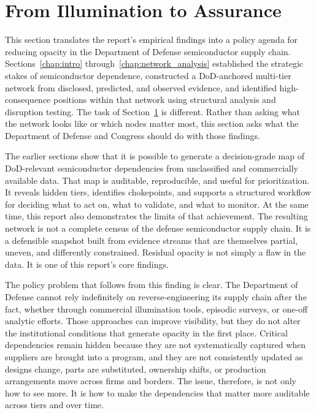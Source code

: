 \chapter{From Illumination to Assurance}
\label{chap:from_illumination_to_assurance}

This section translates the report's empirical findings into a policy agenda for reducing opacity in the Department of Defense semiconductor supply chain. Sections~\ref{chap:intro} through~\ref{chap:network_analysis} established the strategic stakes of semiconductor dependence, constructed a DoD-anchored multi-tier network from disclosed, predicted, and observed evidence, and identified high-consequence positions within that network using structural analysis and disruption testing. The task of Section~\ref{chap:from_illumination_to_assurance} is different. Rather than asking what the network looks like or which nodes matter most, this section asks what the Department of Defense and Congress should do with those findings.

The earlier sections show that it is possible to generate a decision-grade map of DoD-relevant semiconductor dependencies from unclassified and commercially available data. That map is auditable, reproducible, and useful for prioritization. It reveals hidden tiers, identifies chokepoints, and supports a structured workflow for deciding what to act on, what to validate, and what to monitor. At the same time, this report also demonstrates the limits of that achievement. The resulting network is not a complete census of the defense semiconductor supply chain. It is a defensible snapshot built from evidence streams that are themselves partial, uneven, and differently constrained. Residual opacity is not simply a flaw in the data. It is one of this report's core findings.

The policy problem that follows from this finding is clear. The Department of Defense cannot rely indefinitely on reverse-engineering its supply chain after the fact, whether through commercial illumination tools, episodic surveys, or one-off analytic efforts. Those approaches can improve visibility, but they do not alter the institutional conditions that generate opacity in the first place. Critical dependencies remain hidden because they are not systematically captured when suppliers are brought into a program, and they are not consistently updated as designs change, parts are substituted, ownership shifts, or production arrangements move across firms and borders. The issue, therefore, is not only how to see more. It is how to make the dependencies that matter more auditable across tiers and over time.

